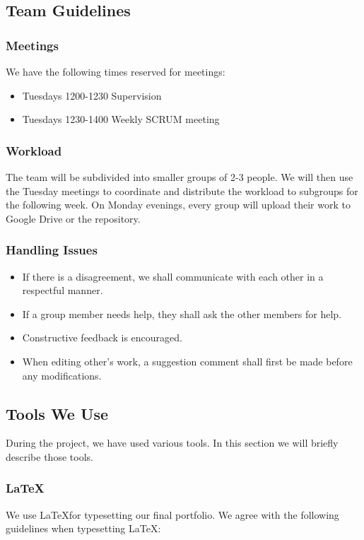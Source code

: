 \subsection{ Team Guidelines}

\subsubsection{Meetings}
We have the following times reserved for meetings:
\begin{itemize}
    \item Tuesdays 1200-1230 Supervision
    \item Tuesdays 1230-1400 Weekly SCRUM meeting
\end{itemize}


\subsubsection{Workload}

The team will be subdivided into smaller groups of 2-3 people. We will then use the Tuesday meetings to coordinate and distribute the workload to subgroups for the following week. On Monday evenings, every group will upload their work to Google Drive or the repository.

\subsubsection{Handling Issues}

\begin{itemize}
    \item If there is a disagreement, we shall communicate with each other in a respectful manner.
    \item If a group member needs help, they shall ask the other members for help.
    \item Constructive feedback is encouraged.
    \item When editing other’s work, a suggestion comment shall first be made before any modifications.
\end{itemize}

\subsection{Tools We Use}
During the project, we have used various tools. In this section we will briefly describe those tools.

\subsubsection{ \LaTeX }
We use \LaTeX  for typesetting our final portfolio. We agree with the following guidelines when typesetting \LaTeX :

